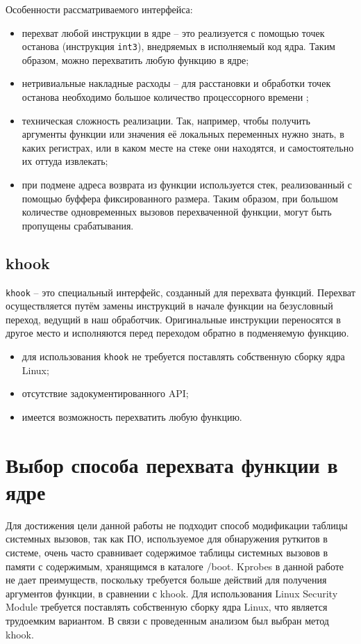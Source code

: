 Особенности рассматриваемого интерфейса:

\begin{itemize}
	\item перехват любой инструкции в ядре -- это реализуется с помощью точек останова (инструкция \texttt{int3}), внедряемых в исполняемый код ядра. Таким образом, можно перехватить любую функцию в ядре;
	\item нетривиальные накладные расходы -- для расстановки и обработки точек останова необходимо большое количество процессорного времени \cite{habr-profiling-linux};
	\item техническая сложность реализации. Так, например, чтобы получить аргументы функции или значения её локальных переменных нужно знать, в каких регистрах, или в каком месте на стеке они находятся, и самостоятельно их оттуда извлекать;
	\item при подмене адреса возврата из функции используется стек, реализованный с помощью буффера фиксированного размера. Таким образом, при большом количестве одновременных вызовов перехваченной функции, могут быть пропущены срабатывания.
\end{itemize}

\subsection{khook}

\texttt{khook} \cite{khook} -- это специальный интерфейс, созданный для перехвата функций. Перехват осуществляется путём замены инструкций в начале функции на безусловный переход, ведущий в
наш обработчик. Оригинальные инструкции переносятся в другое место и
исполняются перед переходом обратно в подменяемую функцию. 

\begin{itemize}
	\item для использования \texttt{khook} не требуется поставлять собственную сборку ядра Linux;
	\item отсутствие задокументированного API;
	\item имеется возможность перехватить любую функцию.
\end{itemize}

\section{Выбор способа перехвата функции в ядре}

Для достижения цели данной работы не подходит способ модификации таблицы
системных вызовов, так как ПО, используемое для обнаружения руткитов в системе, очень часто сравнивает содержимое таблицы системных
вызовов в памяти с содержимым, хранящимся в каталоге /boot. Kprobes в данной работе не дает преимуществ, поскольку требуется больше действий для получения аргументов функции, в сравнении с khook. Для использования Linux Security Module требуется поставлять собственную сборку ядра Linux, что является трудоемким вариантом. В связи с проведенным анализом был выбран метод khook.


